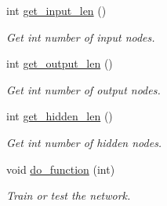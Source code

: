 \begin{DoxyCompactItemize}
int \hyperlink{a00003_a75e25e607afb4e862219b21c0569c893}{get\-\_\-input\-\_\-len} ()
\begin{DoxyCompactList}\small\item\em Get int number of input nodes. \end{DoxyCompactList}\item 
int \hyperlink{a00003_a895c1b35110b7ee5e5adc56a63a55e78}{get\-\_\-output\-\_\-len} ()
\begin{DoxyCompactList}\small\item\em Get int number of output nodes. \end{DoxyCompactList}\item 
int \hyperlink{a00003_ac781308fb521309d657b91a95054be52}{get\-\_\-hidden\-\_\-len} ()
\begin{DoxyCompactList}\small\item\em Get int number of hidden nodes. \end{DoxyCompactList}\item 
void \hyperlink{a00003_acd3d4762d71d54422b45fda3a13976cf}{do\-\_\-function} (int)
\begin{DoxyCompactList}\small\item\em Train or test the network. \end{DoxyCompactList}\end{DoxyCompactItemize}
